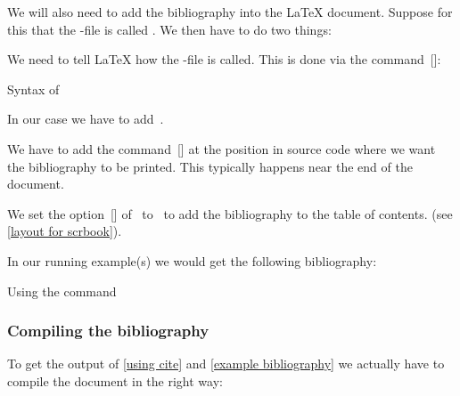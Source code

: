 We will also need to add the bibliography into the {\LaTeX} document.
Suppose for this that the -file is called .
We then have to do two things:
\begin{myitemize}
  \item
    We need to tell {\LaTeX} how the -file is called.
    This is done via the command~[\comname]:
    \begin{showcode}{Syntax of }

    \end{showcode}
    In our case we have to add~.
  \item
    We have to add the command~[\comname] at the position in source code where we want the bibliography to be printed.
    This typically happens near the end of the document.
  \item
    We set the option~[\optname] of~ to~ to add the bibliography to the table of contents. (see \cref{layout for scrbook}).
\end{myitemize}

In our running example(s) we would get the following bibliography:
\let\oldprintbibliography\printbibliography
\renewcommand{\printbibliography}{%
  \oldprintbibliography[
    heading   = subbibliography,
    title     = {Bibliography},
    category  = testentries
  ]
}
\begin{showlatex}[label = {example bibliography}]
  {Using the command~}
\printbibliography
\end{showlatex}
\let\printbibliography\oldprintbibliography



\subsubsection{Compiling the bibliography}

To get the output of \cref{using cite} and \cref{example bibliography} we actually have to compile the document in the right way:

